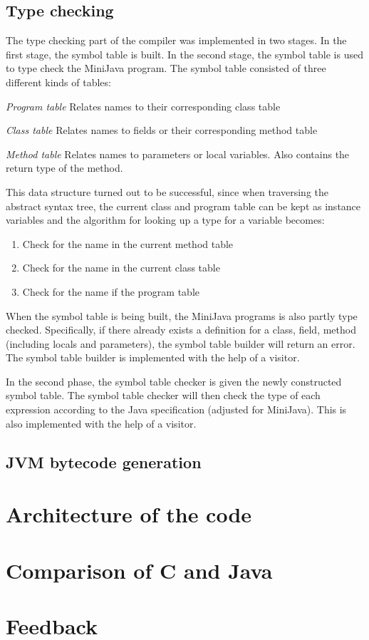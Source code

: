 \documentclass[11pt,oneside,a4paper]{article}
\begin{document}
\subsection{Type checking}
The type checking part of the compiler was implemented in two stages. In the
first stage, the symbol table is built. In the second stage, the symbol table
is used to type check the MiniJava program. The symbol table consisted of three
different kinds of tables:
\begin{description}
\item{\emph{Program table}} Relates names to their corresponding class table
\item{\emph{Class table}} Relates names to fields or their corresponding method
table
\item{\emph{Method table}} Relates names to parameters or local variables. Also
contains the return type of the method.
\end{description}
This data structure turned out to be successful, since when traversing the
abstract syntax tree, the current class and program table can be kept as
instance variables and the algorithm for looking up a type for a variable
becomes:
\begin{enumerate}
\item Check for the name in the current method table
\item Check for the name in the current class table
\item Check for the name if the program table
\end{enumerate}

When the symbol table is being built, the MiniJava programs is also partly type
checked. Specifically, if there already exists a definition for a class, field,
method (including locals and parameters), the symbol table builder will return
an error. The symbol table builder is implemented with the help of a visitor.

In the second phase, the symbol table checker is given the newly constructed 
symbol table. The symbol table checker will then check the type of each
expression according to the Java specification (adjusted for MiniJava). This is
also implemented with the help of a visitor.

\subsection{JVM bytecode generation}
\section{Architecture of the code}
\section{Comparison of C and Java}
\label{sec:discussion}
\appendix
\section{Feedback}
\end{document}
